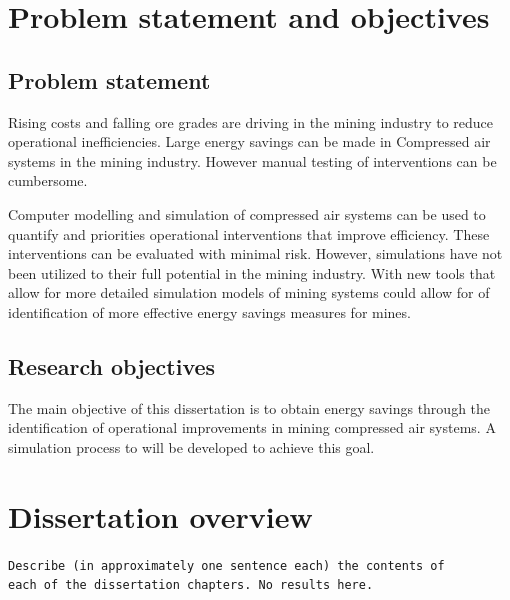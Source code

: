 \section{Problem statement and objectives}
	\subsection{Problem statement}
 		Rising costs and falling ore grades are driving in the mining industry to reduce operational inefficiencies. Large energy savings can be made in Compressed air systems in the mining industry. However manual testing of interventions can be cumbersome.
 		\par
 		Computer modelling and simulation of compressed air systems can be used to quantify and priorities operational interventions that improve efficiency. These interventions can be evaluated with minimal risk. However, simulations have not been utilized to their full potential in the mining industry. With new tools that allow for more detailed simulation models of mining systems could allow for of identification of more effective energy savings measures for mines.
	\subsection{Research objectives}
		The main objective of this dissertation is to obtain energy savings through the identification of operational improvements in mining compressed air systems. A simulation process to will be developed to achieve this goal.
\clearpage
\section{Dissertation overview}
	\texttt{Describe (in approximately one sentence each) the contents of \\each of the dissertation chapters. No results here.}